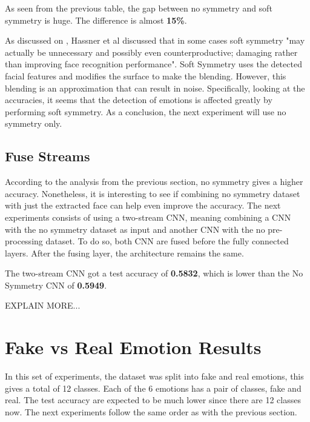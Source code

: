 

As seen from the previous table, the gap between no symmetry and soft symmetry is huge. The difference is almost \textbf{15\%}.

As discussed on \cite{Hassner2015EffectiveImages}, Hassner et al discussed that in some cases soft symmetry "may actually be unnecessary and possibly even counterproductive; damaging rather than improving face recognition performance". Soft Symmetry uses the detected facial features and modifies the surface to make the blending. However, this blending is an approximation that can result in noise. Specifically, looking at the accuracies, it seems that the detection of emotions is affected greatly by performing soft symmetry. As a conclusion, the next experiment will use no symmetry only.

\subsection{Fuse Streams}
According to the analysis from the previous section, no symmetry gives a higher accuracy. Nonetheless, it is interesting to see if combining no symmetry dataset with just the extracted face can help even improve the accuracy. The next experiments consists of using a two-stream CNN, meaning combining a CNN with the no symmetry dataset as input and another CNN with the no pre-processing dataset. To do so, both CNN are fused before the fully connected layers. After the fusing layer, the architecture remains the same.



The two-stream CNN got a test accuracy of \textbf{0.5832}, which is lower than the No Symmetry CNN of \textbf{0.5949}. 

EXPLAIN MORE...

\section{Fake vs Real Emotion Results}

In this set of experiments, the dataset was split into fake and real emotions, this gives a total of 12 classes. Each of the 6 emotions has a pair of classes, fake and real. The test accuracy are expected to be much lower since there are 12 classes now. The next experiments follow the same order as with the previous section.

